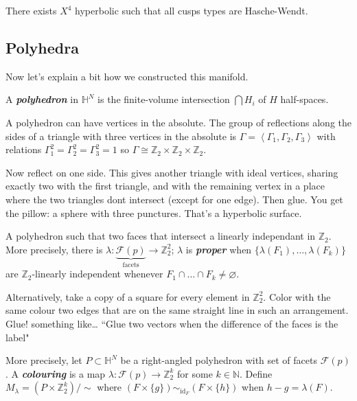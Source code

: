 \begin{thm}\leavevmode
There exists $X^4$ hyperbolic such that all cusps types are Hasche-Wendt.
\end{thm}

\subsection{Polyhedra}

Now let's explain a bit how we constructed this manifold.

\begin{defn}\leavevmode
	A  \textit{\textbf{polyhedron}} in $\mathbb{H}^N$ is the finite-volume intersection $\bigcap H_i $ of $H$ half-spaces.
\end{defn}

\begin{example}\leavevmode
A polyhedron can have vertices in the absolute. The group of reflections along the sides of a triangle with three vertices in the absolute is $\Gamma=\left<\Gamma_1,\Gamma_2,\Gamma_3\right>$ with relations $\Gamma_1^2=\Gamma_2^2=\Gamma_3^2=1$ so $\Gamma\cong\mathbb{Z}_2\times\mathbb{Z}_2\times\mathbb{Z}_2$.

Now reflect on one side. This gives another triangle with ideal vertices, sharing exactly two with the first triangle, and with the remaining vertex in a place where the two triangles dont intersect (except for one edge). Then glue. You get the pillow: a sphere with three punctures. That's a hyperbolic surface.
\end{example}

	A polyhedron such that two faces that intersect a linearly independant in $\mathbb{Z}_2$. More precisely, there is $\lambda:\underbrace{\mathcal{F}(p)}_{\text{facets}}\to \mathbb{Z}_2^2$; $\lambda$ is \textit{\textbf{proper}} when $\{\lambda(F_1),\ldots,\lambda(F_k)\}$ are $\mathbb{Z}_2$-linearly independent whenever $F_1 \cap\ldots\cap F_k\neq  \varnothing$.

	Alternatively, take a copy of a square for every element in $\mathbb{Z}_2^2$. Color with the same colour two edges that are on the same straight line in such an arrangement. Glue! something like… “Glue two vectors when the difference of the faces is the label"

More precisely, let $P \subset \mathbb{H}^N$ be a right-angled polyhedron with set of facets $\mathcal{F}(p)$. A \textit{\textbf{colouring}} is a map $\lambda:\mathcal{F}(p) \to \mathbb{Z}^k_2$ for some $k \in \mathbb{N}$. Define $M_\lambda = (P \times \mathbb{Z}_2^k)/\sim$ where $(F\times \{ g\})\sim_{\operatorname{id}_F} (F\times \{ h\})$ when $h-g=\lambda(F)$.


